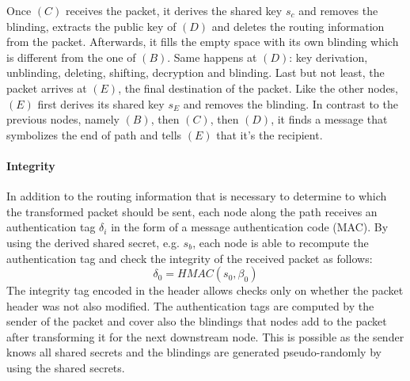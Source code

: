 \newline Once $(C)$ receives the packet, it derives the shared key $s_c$ and removes the blinding, extracts the public key of $(D)$ and deletes the routing information from the packet. Afterwards, it fills the empty space with its own blinding which is different from the one of $(B)$. 
\newline Same happens at $(D)$: key derivation, unblinding, deleting, shifting, decryption and blinding.
\newline Last but not least, the packet arrives at $(E)$, the final destination of the packet. Like the other nodes, $(E)$ first derives its shared key $s_E$ and removes the blinding. In contrast to the previous nodes, namely $(B)$, then $(C)$, then $(D)$, it finds a message that symbolizes the end of path and tells $(E)$ that it’s the recipient.

\paragraph{Integrity}
In addition to the routing information that is necessary to determine to which the transformed packet should be sent, each node along the path receives an authentication tag $\delta_i$ in the form of a message authentication code (MAC).
\newline By using the derived shared secret, e.g. $s_b$, each node is able to recompute the authentication tag and check the integrity of the received packet as follows:
                                                              $$\delta_0=HMAC(s_0,\beta_0)$$
The integrity tag  encoded in the header allows checks only on whether the packet header was not also modified. 
The authentication tags are computed by the sender of the packet and cover also the blindings that nodes add to the packet after transforming it for the next downstream node. This is possible as the sender knows all shared secrets and the blindings are generated pseudo-randomly by using the shared secrets.










